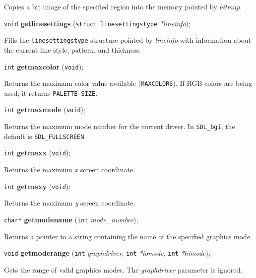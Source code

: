 \documentclass[a4paper,11pt]{article}
\newcommand{\SDLbgi}{\texttt{SDL\_bgi}}
\newcommand{\V}{\texttt{void}}      %
\newcommand{\I}{\texttt{int}}       %
\newcommand{\func}[1]{\textbf{#1}}  %
\newcommand{\A}[1]{\emph{#1}}       %
\newcommand{\T}[1]{\texttt{#1}}     %
\newenvironment{bgi}
{ %
  \begin{snugshade}
}
{ %
  \end{snugshade}
}
\begin{document}
Copies a bit image of the specified region into the memory pointed by
\A{bitmap}.


\begin{bgi}
\V{} \func{getlinesettings} (\texttt{struct linesettingstype}
\A{*lineinfo});
\end{bgi}

Fills the \texttt{linesettingstype} structure pointed by \A{lineinfo}
with information about the current line style, pattern, and thickness.


\begin{bgi}
\I{} \func{getmaxcolor} (\V{});
\end{bgi}

Returns the maximum color value available (\T{MAXCOLORS}). If RGB
colors are being used, it returns \T{PALETTE\_SIZE}.


\begin{bgi}
\I{} \func{getmaxmode} (\V{}); 
\end{bgi}

Returns the maximum mode number for the current driver. In \SDLbgi,
the default is \T{SDL\_FULLSCREEN}.


\begin{bgi}
\I{} \func{getmaxx} (\V{});
\end{bgi}

Returns the maximum \A{x} screen coordinate.


\begin{bgi}
\I{} \func{getmaxy} (\V{});
\end{bgi}

Returns the maximum \A{y} screen coordinate.


\begin{bgi}
\texttt{char*} \func{getmodename} (\I{} \A{mode\_number});
\end{bgi}

Returns a pointer to a string containing the name of the specified
graphics mode.


\begin{bgi}
\V{} \func{getmoderange} (\I{} \A{graphdriver}, \I{} \A{*lomode}, \I{}
\A{*himode});
\end{bgi}

Gets the range of valid graphics modes. The \A{graphdriver} parameter
is ignored.
\end{document}
